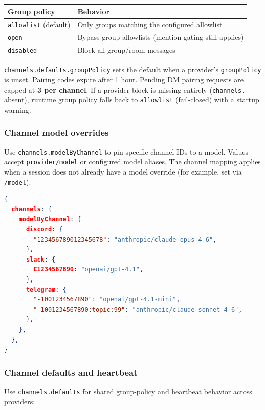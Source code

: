 \begin{table}[h]
\centering
\small
\begin{tabular}{|l|l|}
\hline
Group policy & Behavior \\
\hline
\texttt{allowlist} (default) & Only groups matching the configured allowlist \\
\hline
\texttt{open} & Bypass group allowlists (mention-gating still applies) \\
\hline
\texttt{disabled} & Block all group/room messages \\
\hline
\end{tabular}
\end{table}



\texttt{channels.defaults.groupPolicy} sets the default when a provider's \texttt{groupPolicy} is unset.
Pairing codes expire after 1 hour. Pending DM pairing requests are capped at \textbf{3 per channel}.
If a provider block is missing entirely (\texttt{channels.} absent), runtime group policy falls back to \texttt{allowlist} (fail-closed) with a startup warning.

\subsubsection{Channel model overrides}


Use \texttt{channels.modelByChannel} to pin specific channel IDs to a model. Values accept \texttt{provider/model} or configured model aliases. The channel mapping applies when a session does not already have a model override (for example, set via \texttt{/model}).

\begin{lstlisting}[language=json]
{
  channels: {
    modelByChannel: {
      discord: {
        "123456789012345678": "anthropic/claude-opus-4-6",
      },
      slack: {
        C1234567890: "openai/gpt-4.1",
      },
      telegram: {
        "-1001234567890": "openai/gpt-4.1-mini",
        "-1001234567890:topic:99": "anthropic/claude-sonnet-4-6",
      },
    },
  },
}
\end{lstlisting}


\subsubsection{Channel defaults and heartbeat}


Use \texttt{channels.defaults} for shared group-policy and heartbeat behavior across providers:

